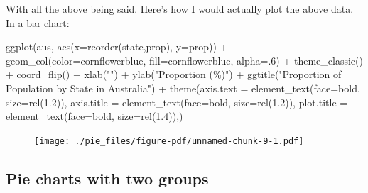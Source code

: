 \documentclass[
  letterpaper,
  DIV=11,
  numbers=noendperiod]{scrreprt}
\newenvironment{Shaded}{\begin{snugshade}}{\end{snugshade}}
\newcommand{\AttributeTok}[1]{\textcolor[rgb]{0.40,0.45,0.13}{#1}}
\newcommand{\DecValTok}[1]{\textcolor[rgb]{0.68,0.00,0.00}{#1}}
\newcommand{\FloatTok}[1]{\textcolor[rgb]{0.68,0.00,0.00}{#1}}
\newcommand{\FunctionTok}[1]{\textcolor[rgb]{0.28,0.35,0.67}{#1}}
\newcommand{\NormalTok}[1]{\textcolor[rgb]{0.00,0.23,0.31}{#1}}
\newcommand{\SpecialCharTok}[1]{\textcolor[rgb]{0.37,0.37,0.37}{#1}}
\newcommand{\StringTok}[1]{\textcolor[rgb]{0.13,0.47,0.30}{#1}}
\begin{document}
With all the above being said. Here's how I would actually plot the
above data. In a bar chart:

\begin{Shaded}
\begin{Highlighting}[]
\FunctionTok{ggplot}\NormalTok{(aus, }\FunctionTok{aes}\NormalTok{(}\AttributeTok{x=}\FunctionTok{reorder}\NormalTok{(state,prop), }\AttributeTok{y=}\NormalTok{prop)) }\SpecialCharTok{+}
  \FunctionTok{geom\_col}\NormalTok{(}\AttributeTok{color=}\StringTok{\textquotesingle{}cornflowerblue\textquotesingle{}}\NormalTok{, }\AttributeTok{fill=}\StringTok{\textquotesingle{}cornflowerblue\textquotesingle{}}\NormalTok{, }\AttributeTok{alpha=}\NormalTok{.}\DecValTok{6}\NormalTok{) }\SpecialCharTok{+}
  \FunctionTok{theme\_classic}\NormalTok{() }\SpecialCharTok{+}
  \FunctionTok{coord\_flip}\NormalTok{() }\SpecialCharTok{+}
  \FunctionTok{xlab}\NormalTok{(}\StringTok{""}\NormalTok{) }\SpecialCharTok{+}
  \FunctionTok{ylab}\NormalTok{(}\StringTok{"Proportion (\%)"}\NormalTok{) }\SpecialCharTok{+}
  \FunctionTok{ggtitle}\NormalTok{(}\StringTok{"Proportion of Population by State in Australia"}\NormalTok{) }\SpecialCharTok{+}
  \FunctionTok{theme}\NormalTok{(}\AttributeTok{axis.text =} \FunctionTok{element\_text}\NormalTok{(}\AttributeTok{face=}\StringTok{\textquotesingle{}bold\textquotesingle{}}\NormalTok{, }\AttributeTok{size=}\FunctionTok{rel}\NormalTok{(}\FloatTok{1.2}\NormalTok{)),}
        \AttributeTok{axis.title =} \FunctionTok{element\_text}\NormalTok{(}\AttributeTok{face=}\StringTok{\textquotesingle{}bold\textquotesingle{}}\NormalTok{, }\AttributeTok{size=}\FunctionTok{rel}\NormalTok{(}\FloatTok{1.2}\NormalTok{)),}
        \AttributeTok{plot.title =} \FunctionTok{element\_text}\NormalTok{(}\AttributeTok{face=}\StringTok{\textquotesingle{}bold\textquotesingle{}}\NormalTok{, }\AttributeTok{size=}\FunctionTok{rel}\NormalTok{(}\FloatTok{1.4}\NormalTok{)),) }
\end{Highlighting}
\end{Shaded}

\begin{figure}[H]

{\centering \texttt{[image: ./pie\_files/figure-pdf/unnamed-chunk-9-1.pdf]}

}

\end{figure}

\hypertarget{pie-charts-with-two-groups}{%
\subsection{Pie charts with two
groups}\label{pie-charts-with-two-groups}}
\end{document}
